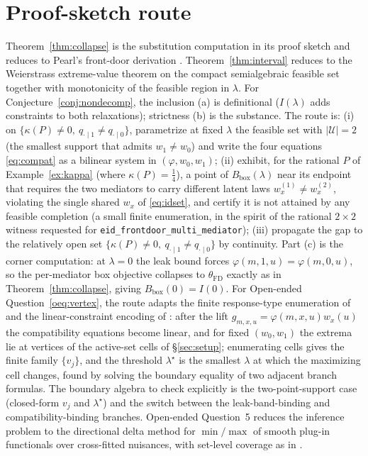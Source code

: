 \documentclass[11pt]{article}
\theoremstyle{definition}
\theoremstyle{plain}
\theoremstyle{remark}
\begin{document}
\section{Proof-sketch route}
\label{sec:route}
Theorem~\ref{thm:collapse} is the substitution computation in its proof sketch and reduces to Pearl's
front-door derivation \citep{Pearl1995CausalDiagrams}. Theorem~\ref{thm:interval} reduces to the Weierstrass
extreme-value theorem on the compact semialgebraic feasible set together with monotonicity of the feasible
region in $\lambda$. For Conjecture~\ref{conj:nondecomp}, the inclusion (a) is definitional ($I(\lambda)$ adds
constraints to both relaxations); strictness (b) is the substance. The route is: (i) on
$\{\kappa(P)\neq0,\ q_{\cdot\mid1}\neq q_{\cdot\mid0}\}$, parametrize at fixed $\lambda$ the feasible set with $|\mathcal U|=2$ (the smallest
support that admits $w_1\neq w_0$) and write the four equations \eqref{eq:compat} as a bilinear system in
$(\varphi,w_0,w_1)$; (ii) exhibit, for the rational $P$ of Example~\ref{ex:kappa} (where $\kappa(P)=\tfrac14$), a point of
$B_{\mathrm{box}}(\lambda)$ near its endpoint that requires the two mediators to carry different latent laws
$w_x^{(1)}\neq w_x^{(2)}$, violating the single shared $w_x$ of \eqref{eq:idset}, and certify it is not
attained by any feasible completion (a small finite enumeration, in the spirit of the rational $2\times2$
witness requested for \texttt{eid\_frontdoor\_multi\_mediator}); (iii) propagate the gap to the relatively
open set $\{\kappa(P)\neq0,\ q_{\cdot\mid1}\neq q_{\cdot\mid0}\}$ by continuity. Part (c) is the corner computation: at $\lambda=0$ the leak
bound forces $\varphi(m,1,u)=\varphi(m,0,u)$, so the per-mediator box objective collapses to
$\theta_{\mathrm{FD}}$ exactly as in Theorem~\ref{thm:collapse}, giving $B_{\mathrm{box}}(0)=I(0)$. For
Open-ended Question~\ref{oeq:vertex}, the route adapts the finite response-type enumeration
of \citet{BalkePearl1997Bounds} and the linear-constraint encoding of
\citet{FinkelsteinAdamsSariaShpitser2020MeasurementError}: after the lift $g_{m,x,u}=\varphi(m,x,u)w_x(u)$
the compatibility equations become linear, and for fixed $(w_0,w_1)$ the extrema lie at vertices of the
active-set cells of \S\ref{sec:setup}; enumerating cells gives the finite family $\{v_j\}$, and the
threshold $\lambda^\star$ is the smallest $\lambda$ at which the maximizing cell changes, found by solving
the boundary equality of two adjacent branch formulas. The boundary algebra to check explicitly is the
two-point-support case (closed-form $v_j$ and $\lambda^\star$) and the switch between the leak-band-binding
and compatibility-binding branches. Open-ended Question~5 reduces the inference problem to the directional
delta method for $\min/\max$ of smooth plug-in functionals \citep{FangSantos2019DirectionallyDifferentiable}
over cross-fitted nuisances, with set-level coverage as in \citet{ChernozhukovHongTamer2007ParameterSets}.
\end{document}
